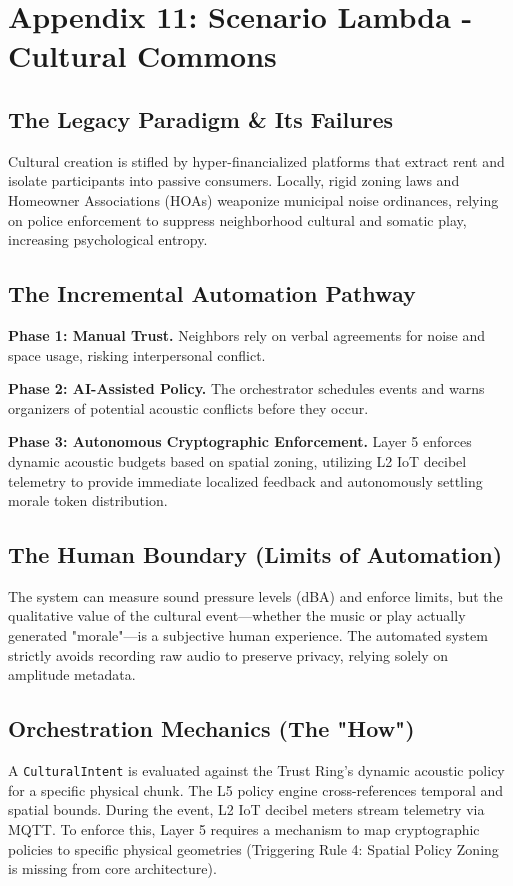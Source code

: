 \chapter{Appendix 11: Scenario Lambda - Cultural Commons}

\section{The Legacy Paradigm \& Its Failures}
Cultural creation is stifled by hyper-financialized platforms that extract rent and isolate participants into passive consumers. Locally, rigid zoning laws and Homeowner Associations (HOAs) weaponize municipal noise ordinances, relying on police enforcement to suppress neighborhood cultural and somatic play, increasing psychological entropy.

\section{The Incremental Automation Pathway}
\textbf{Phase 1: Manual Trust.} Neighbors rely on verbal agreements for noise and space usage, risking interpersonal conflict.

\textbf{Phase 2: AI-Assisted Policy.} The orchestrator schedules events and warns organizers of potential acoustic conflicts before they occur.

\textbf{Phase 3: Autonomous Cryptographic Enforcement.} Layer 5 enforces dynamic acoustic budgets based on spatial zoning, utilizing L2 IoT decibel telemetry to provide immediate localized feedback and autonomously settling morale token distribution.

\section{The Human Boundary (Limits of Automation)}
The system can measure sound pressure levels (dBA) and enforce limits, but the qualitative value of the cultural event—whether the music or play actually generated "morale"—is a subjective human experience. The automated system strictly avoids recording raw audio to preserve privacy, relying solely on amplitude metadata.

\section{Orchestration Mechanics (The "How")}
A \texttt{CulturalIntent} is evaluated against the Trust Ring's dynamic acoustic policy for a specific physical chunk. The L5 policy engine cross-references temporal and spatial bounds. During the event, L2 IoT decibel meters stream telemetry via MQTT. To enforce this, Layer 5 requires a mechanism to map cryptographic policies to specific physical geometries (Triggering Rule 4: Spatial Policy Zoning is missing from core architecture).
